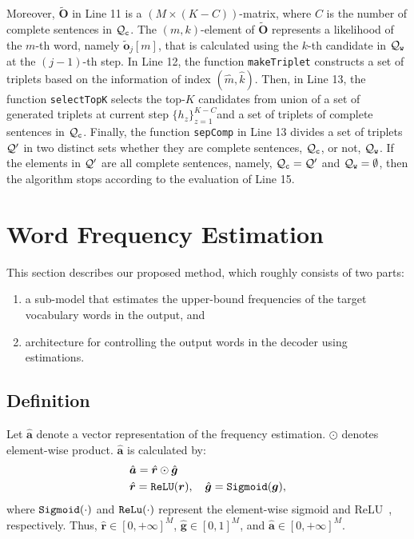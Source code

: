 \documentclass[11pt]{article}
\begin{document}
Moreover, $\tilde{\bm{O}}$ in Line 11 is a $({M\times (K-C)})$-matrix, where $C$ is the number of complete sentences in ${\cal Q}_{\tt c}$.
   The $(m,k)$-element of $\tilde{\bm{O}}$ represents a likelihood of the $m$-th word, namely $\tilde{\bm{o}}_j[m]$, that is calculated using the $k$-th candidate in ${\cal Q}_{\tt w}$ at the $(j-1)$-th step.
In Line 12, the function {\tt makeTriplet} constructs a set of triplets based on the information of index $(\hat{m},\hat{k})$.
   Then, in Line 13, the function {\tt selectTopK} selects the top-$K$ candidates from union of a set of generated triplets at current step $\{h_{z}\}^{K-C}_{z=1}$and a set of triplets of complete sentences in ${\cal Q}_{\tt c}$.
Finally, the function {\tt sepComp} in Line 13 divides a set of triplets ${\cal Q}'$ in two distinct sets whether they are complete sentences, ${\cal Q}_{\tt c}$, or not, ${\cal Q}_{\tt w}$.
If the elements in ${\cal Q}'$ are all complete sentences, namely, ${\cal Q}_{\tt c} = {\cal Q}'$ and ${\cal Q}_{\tt w}=\emptyset$, then the algorithm stops according to the evaluation of Line 15.

   
\section{Word Frequency Estimation}
   This section describes our proposed method, which roughly
consists of two parts:
   \begin{enumerate}
    \item a sub-model that estimates the upper-bound frequencies of the target vocabulary words in the output, and 
    \item  architecture for controlling the output words in the decoder using estimations.
   \end{enumerate}

\subsection{Definition}
Let $\hat{\bm{a}}$ denote a vector representation of the frequency estimation. 
$\odot$ denotes element-wise product.
$\hat{\bm{a}}$ is calculated by:
\begin{align}
&
 \hat{\bm{a}}
 =
 \hat{\bm{r}}
 \odot
 \hat{\bm{g}}
 \nonumber \\
&
 \hat{\bm{r}} = {\tt ReLU} (\bm{r}),
 \,\,\,\,\,\,
 \hat{\bm{g}} = {\tt Sigmoid} (\bm{g})
 \label{eq:wae_model}
 ,
\end{align}
where ${\tt Sigmoid}(\cdot)$ and ${\tt ReLu}(\cdot)$ represent the element-wise sigmoid and ReLU~\cite{AISTATS2011_GlorotBB11}, respectively.
Thus, $\hat{\bm{r}}\!\in\![0, +\infty]^{M}$,
   $\hat{\bm{g}}\!\in\![0,1]^{M}$, and
   $\hat{\bm{a}}\!\in\! [0, +\infty]^{M}$.
\end{document}
